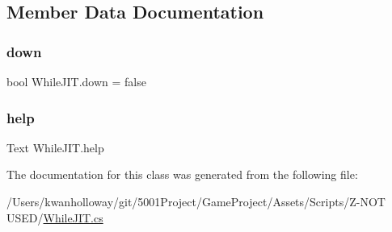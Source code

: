 \subsection{Member Data Documentation}
\mbox{\label{class_while_j_i_t_a0c18911e6e115ab64186a82b55e01a66}} 
\subsubsection{\texorpdfstring{down}{down}}
{\footnotesize\ttfamily bool While\+J\+I\+T.\+down = false}

\mbox{\label{class_while_j_i_t_a655e87cf228ee7e4f45610a782bf5a1c}} 
\subsubsection{\texorpdfstring{help}{help}}
{\footnotesize\ttfamily Text While\+J\+I\+T.\+help}



The documentation for this class was generated from the following file\+:\begin{DoxyCompactItemize}
\item 
/\+Users/kwanholloway/git/5001\+Project/\+Game\+Project/\+Assets/\+Scripts/\+Z-\/\+N\+O\+T U\+S\+E\+D/\hyperlink{_while_j_i_t_8cs}{While\+J\+I\+T.\+cs}\end{DoxyCompactItemize}
